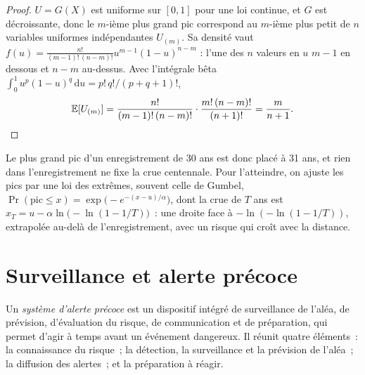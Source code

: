 \begin{proof}
$U = G(X)$ est uniforme sur $[0, 1]$ pour une loi continue, et $G$ est décroissante, donc le $m$-ième plus grand pic
correspond au $m$-ième plus petit de $n$ variables uniformes indépendantes
$U_{(m)}$. Sa densité vaut $f(u) = \frac{n!}{(m-1)!\,(n-m)!}u^{m-1}(1-u)^{n-m}$ : l'une des $n$ valeurs en $u$
$m - 1$ en dessous et $n - m$ au-dessus. Avec l'intégrale bêta $\int_0^1 u^{p}(1-u)^{q}\,\mathrm{d}u
= p!\,q!/(p + q + 1)!$,
\begin{equation*}
\mathbb{E}[U_{(m)}] = \frac{n!}{(m-1)!\,(n-m)!}\cdot\frac{m!\,(n-m)!}{(n+1)!} = \frac{m}{n+1}. \qedhere
\end{equation*}
\end{proof}

Le plus grand pic d'un enregistrement de 30 ans est donc placé à 31 ans, et rien dans l'enregistrement ne fixe
la crue centennale. Pour l'atteindre, on ajuste les pics par une loi des extrêmes, souvent celle de Gumbel,
$\Pr(\text{pic} \leq x) = \exp\bigl(-e^{-(x - u)/\alpha}\bigr)$, dont la crue de $T$ ans est $x_T = u
- \alpha\ln\bigl(-\ln(1 - 1/T)\bigr)$~: une droite face à $-\ln(-\ln(1 - 1/T))$, extrapolée
au-delà de l'enregistrement, avec un risque qui croît avec la distance.

\section{Surveillance et alerte précoce}\label{sec:b2:geological-hazards:warning}

\begin{definition}\label{def:b2:geological-hazards:warning}
Un \emph{système d'alerte précoce} est un dispositif
intégré de surveillance de l'aléa, de prévision, d'évaluation du risque, de communication
et de préparation, qui permet d'agir à temps avant un événement dangereux. Il
réunit quatre éléments~: la connaissance du risque~; la détection, la surveillance
et la prévision de l'aléa~; la diffusion des alertes~; et la préparation à réagir.
\end{definition}

